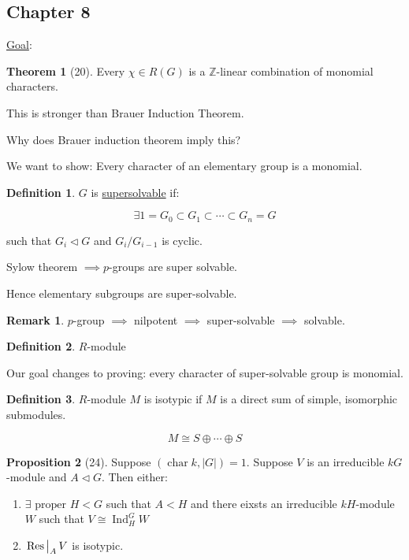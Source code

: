 \documentclass{article}
\theoremstyle{definition}
\newtheorem*{definition}{Definition}
\newtheorem{theorem}{Theorem}
\newtheorem{proposition}[theorem]{Proposition}
\newtheorem*{remark}{Remark}
\begin{document}
\subsection*{Chapter 8}

\underline{Goal}:

\begin{theorem}
    [20] Every \(\chi \in R(G)\) is a \(\mathbb{Z}\)-linear combination of monomial characters.

    This is stronger than Brauer Induction Theorem.
\end{theorem}

Why does Brauer induction theorem imply this?

We want to show: Every character of an elementary group is a monomial.

\begin{definition}
    \(G\) is \underline{supersolvable} if:
    
    \[
        \exists 1 = G_0 \subset G_1 \subset \cdots \subset G_n = G
    \]

    such that \(G_i \triangleleft G\) and \(G_i / G_{i-1}\) is cyclic.

    Sylow theorem \(\implies p\)-groups are super solvable.

    Hence elementary subgroups are super-solvable.
\end{definition}

\begin{remark}
    \(p\)-group \(\implies\) nilpotent \(\implies\) super-solvable \(\implies\) solvable.
\end{remark}

\begin{definition}
    \(R\)-module
\end{definition}

Our goal changes to proving: every character of super-solvable group is monomial.

\begin{definition}
    \(R\)-module \(M\) is isotypic if \(M\) is a direct sum of simple, isomorphic submodules.

    \[
        M \cong S \oplus \cdots \oplus S
    \]
\end{definition}

\begin{proposition}
    [24] Suppose \((\operatorname{char} k, \vert G \vert)=1\). Suppose \(V\) is an irreducible \(kG\)-module and \(A \triangleleft G\). Then either:

    \begin{enumerate}[label=\alph*)]
        \item \(\exists\text{ proper }  H < G\) such that \(A < H\) and there eixsts an irreducible \(kH\)-module \(W\) such that \(V \cong \operatorname{Ind}_H^G W\)
        \item \(\eval{\operatorname{Res}}_A V\) is isotypic.    
    \end{enumerate} 
\end{proposition}
\end{document}
